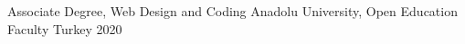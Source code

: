 

\begin{cventries}

  \cventry
    {Associate Degree, Web Design and Coding} %
    {Anadolu University, Open Education Faculty} %
    {Turkey} %
    {2020} %
    {
      \begin{cvitems} %
      \end{cvitems}
    }

\end{cventries}
